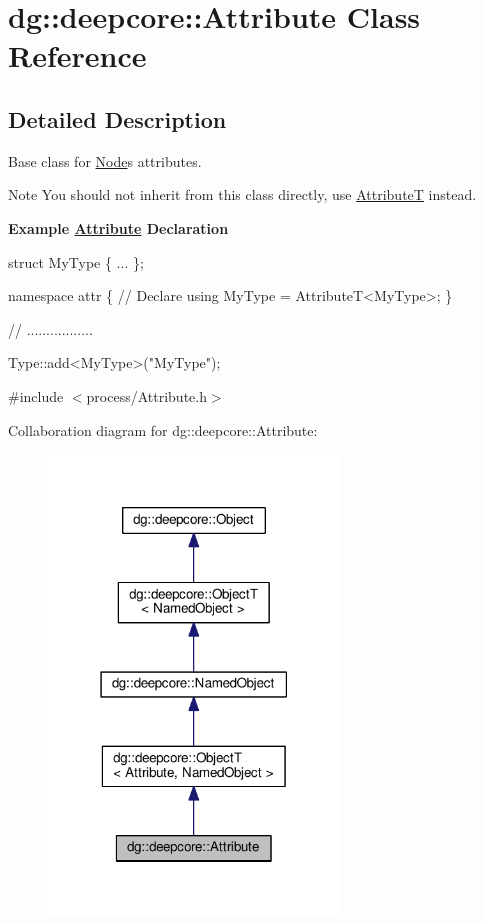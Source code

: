 \hypertarget{classdg_1_1deepcore_1_1_attribute}{}\section{dg\+:\+:deepcore\+:\+:Attribute Class Reference}
\label{classdg_1_1deepcore_1_1_attribute}


\subsection{Detailed Description}
Base class for \hyperlink{classdg_1_1deepcore_1_1_node}{Node}\textquotesingle{}s attributes. 

\begin{DoxyNote}{Note}
You should not inherit from this class directly, use \hyperlink{structdg_1_1deepcore_1_1_attribute_t}{AttributeT} instead.
\end{DoxyNote}
{\bfseries Example \hyperlink{classdg_1_1deepcore_1_1_attribute}{Attribute} Declaration} 
\begin{DoxyCode}
\textcolor{keyword}{struct }MyType \{ ... \};

\textcolor{keyword}{namespace }attr \{
    \textcolor{comment}{// Declare}
    \textcolor{keyword}{using} MyType = AttributeT<MyType>;
\}

\textcolor{comment}{// .................}

Type::add<MyType>(\textcolor{stringliteral}{"MyType"});
\end{DoxyCode}
 

{\ttfamily \#include $<$process/\+Attribute.\+h$>$}



Collaboration diagram for dg\+:\+:deepcore\+:\+:Attribute\+:
\nopagebreak
\begin{figure}[H]
\begin{center}
\leavevmode
\includegraphics[width=219pt]{classdg_1_1deepcore_1_1_attribute__coll__graph}
\end{center}
\end{figure}

